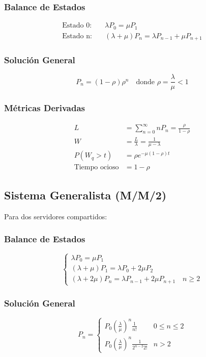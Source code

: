 \documentclass[letterpaper, 12pt]{report}
\begin{document}
\subsubsection{Balance de Estados}
\begin{align*}
\text{Estado 0:} & \quad \lambda P_0 = \mu P_1 \\
\text{Estado n:} & \quad (\lambda + \mu)P_n = \lambda P_{n-1} + \mu P_{n+1}
\end{align*}

\subsubsection{Solución General}
\[
P_n = (1 - \rho)\rho^n \quad \text{donde } \rho = \frac{\lambda}{\mu} < 1
\]

\subsubsection{Métricas Derivadas}
\begin{align*}
L &= \sum_{n=0}^\infty nP_n = \frac{\rho}{1 - \rho} \\
W &= \frac{L}{\lambda} = \frac{1}{\mu - \lambda} \\
P(W_q > t) &= \rho e^{-\mu(1-\rho)t} \\
\text{Tiempo ocioso} &= 1 - \rho
\end{align*}

\subsection{Sistema Generalista (M/M/2)}
Para dos servidores compartidos:

\subsubsection{Balance de Estados}
\[
\begin{cases}
\lambda P_0 = \mu P_1 \\
(\lambda + \mu)P_1 = \lambda P_0 + 2\mu P_2 \\
(\lambda + 2\mu)P_n = \lambda P_{n-1} + 2\mu P_{n+1} \quad n \geq 2
\end{cases}
\]

\subsubsection{Solución General}
\[
P_n = \begin{cases}
P_0 \left(\frac{\lambda}{\mu}\right)^n \frac{1}{n!} & 0 \leq n \leq 2 \\
P_0 \left(\frac{\lambda}{\mu}\right)^n \frac{1}{2^{n-2}2!} & n > 2
\end{cases}
\]
\end{document}
